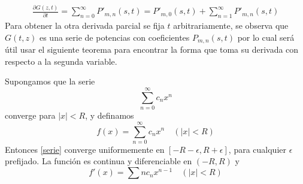 \begin{eqnarray}
    \frac{\partial G(z,t)}{\partial t}=\sum_{n=0}^\infty P'_{m,n}(s,t)=P'_{m,0}(s,t)+\sum_{n=1}^\infty P'_{m,n}(s,t)
\end{eqnarray}
Para obtener la otra derivada parcial se fija $t$ arbitrariamente, se observa que $G(t,z)$ es una serie de potencias con coeficientes $P_{m,n}(s,t)$ por lo cual será útil usar el siguiente teorema para encontrar la forma que toma su derivada con respecto a la segunda variable.
\begin{Teo}
    Supongamos que la serie \begin{equation}
    \sum_{n=0}^\infty c_n x^n\label{serie}
    \end{equation} converge para $|x|<R$, y definamos
    $$f(x)=\sum_{n=0}^\infty c_n x^n\quad(|x|<R)$$
    Entonces \ref{serie} converge uniformemente en $[-R-\epsilon,R+\epsilon]$, para cualquier $\epsilon$ prefijado. La función es continua y diferenciable en $(-R,R)$ y $$f'(x)=\sum n c_n x^{n-1}\quad(|x|<R)$$
\end{Teo} 